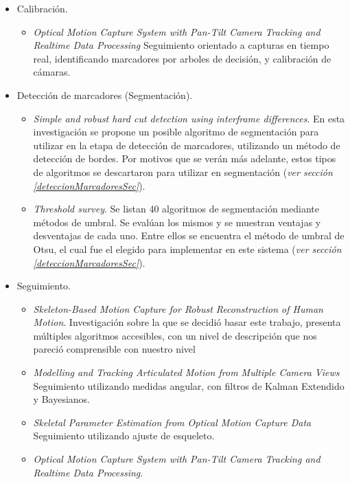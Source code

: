 \begin{itemize}
	\item Calibración.
	\begin{itemize}
		\item \emph{Optical Motion Capture System with Pan-Tilt Camera Tracking and Realtime Data Processing}\cite{kurihara2002optical} Seguimiento orientado a capturas en tiempo real, identificando marcadores por arboles de decisión, y calibración de cámaras.
	\end{itemize}
	\item Detección de marcadores (Segmentación).
	\begin{itemize}
		\item \emph{Simple and robust hard cut detection using interframe differences}\cite{pardo2005simple}. En esta investigación se propone un posible algoritmo de segmentación para utilizar en la etapa de detección de marcadores, utilizando un método de detección de bordes. Por motivos que se verán más adelante, estos tipos de algoritmos se descartaron para utilizar en segmentación (\textit{ver sección \ref{deteccionMarcadoresSec}}).
		\item \emph{Threshold survey}\cite{surveyThreshold}. Se listan 40 algoritmos de segmentación mediante métodos de umbral. Se evalúan los mismos y se muestran ventajas y desventajas de cada uno. Entre ellos se encuentra el método de umbral de Otsu\cite{otsu}, el cual fue el elegido para implementar en este sistema (\textit{ver sección \ref{deteccionMarcadoresSec}}).
	\end{itemize}
	\item Seguimiento.
	\begin{itemize}
		\item \emph{Skeleton-Based Motion Capture for Robust Reconstruction of Human Motion}\cite{herda}. Investigación sobre la que se decidió basar este trabajo, presenta múltiples algoritmos accesibles, con un nivel de descripción que nos pareció comprensible con nuestro nivel
		\item \emph{Modelling and Tracking Articulated Motion from Multiple Camera Views}\cite{ringer2000modelling} Seguimiento utilizando medidas angular, con filtros de Kalman Extendido y Bayesianos.
		\item \emph{Skeletal Parameter Estimation from Optical Motion Capture Data}\cite{kirk2005skeletal} Seguimiento utilizando ajuste de esqueleto.
		\item \emph{Optical Motion Capture System with Pan-Tilt Camera Tracking and  Realtime Data Processing}\cite{kurihara2002optical}.

\end{itemize}
\end{itemize}
